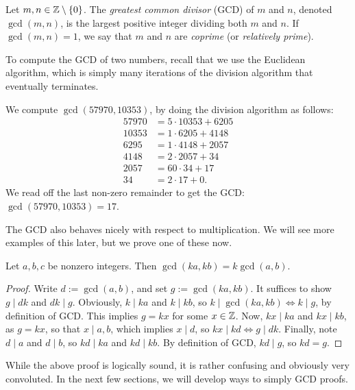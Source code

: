 \documentclass{article}
\begin{document}
\begin{definition}
Let $m,n\in \mathbb Z\setminus\{0\}$. The \textit{greatest common divisor} (GCD) of $m$ and $n$, denoted $\gcd(m, n)$, is the largest positive integer dividing both $m$ and $n$. If $\gcd(m,n) = 1$, we say that $m$ and $n$ are \textit{coprime} (or \textit{relatively prime}).
\end{definition}

To compute the GCD of two numbers, recall that we use the Euclidean algorithm, which is simply many iterations of the division algorithm that eventually terminates.

\newpage
\begin{example}
We compute $\gcd(57970, 10353)$, by doing the division algorithm as follows:
\begin{align*}
    57970 &= 5\cdot 10353 + 6205 \\
    10353 &= 1\cdot 6205 + 4148 \\
    6295 &= 1\cdot 4148 + 2057 \\
    4148 &= 2\cdot 2057 + 34 \\
    2057 &= 60\cdot 34 + 17 \\
    34 &= 2\cdot 17 + 0.
\end{align*}
We read off the last non-zero remainder to get the GCD: $\gcd(57970, 10353) = \boxed{17}$.
\end{example}

The GCD also behaves nicely with respect to multiplication. We will see more examples of this later, but we prove one of these now.
\begin{proposition}
Let $a,b,c$ be nonzero integers. Then $\gcd(ka, kb) = k\gcd(a,b)$.
\end{proposition}
\begin{proof}
Write $d := \gcd(a,b)$, and set $g := \gcd(ka, kb)$. It suffices to show $g \mid dk$ and $dk\mid g$. Obviously, $k\mid ka$ and $k\mid kb$, so $k\mid \gcd(ka, kb) \iff k\mid g$, by definition of GCD. This implies $g = kx$ for some $x\in\mathbb Z$. Now, $kx\mid ka$ and $kx\mid kb$, as $g = kx$, so that $x\mid a,b$, which implies $x\mid d$, so $kx \mid kd \iff g\mid dk$. Finally, note $d\mid a$ and $d\mid b$, so $kd\mid ka$ and $kd\mid kb$. By definition of GCD, $kd\mid g$, so $kd = g$.
\end{proof}

While the above proof is logically sound, it is rather confusing and obviously very convoluted. In the next few sections, we will develop ways to simply GCD proofs.
\end{document}
